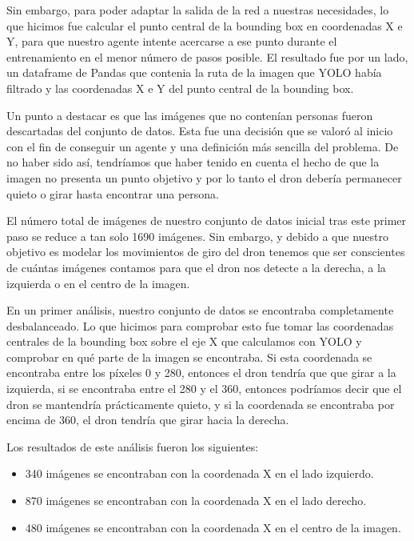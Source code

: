 Sin embargo, para poder adaptar la salida de la red a nuestras necesidades, lo que hicimos fue calcular el punto central de la bounding box en coordenadas X e Y, para que nuestro agente intente acercarse a ese punto durante el entrenamiento en el menor número de pasos posible.
El resultado fue por un lado, un dataframe de Pandas que contenia la ruta de la imagen que YOLO había filtrado y las coordenadas X e Y del punto central de la bounding box.
\medskip

Un punto a destacar es que las imágenes que no contenían personas fueron descartadas del conjunto de datos. Esta fue una decisión que se valoró al inicio con el fin de conseguir un agente y una definición más sencilla del problema. De no haber sido así, tendríamos que haber tenido en cuenta el hecho de que la imagen no presenta un punto objetivo y por lo tanto el dron debería permanecer quieto o girar hasta encontrar una persona.
\medskip

El número total de imágenes de nuestro conjunto de datos inicial tras este primer paso se reduce a tan solo 1690 imágenes. Sin embargo, y debido a que nuestro objetivo es modelar los movimientos de giro del dron tenemos que ser conscientes de cuántas imágenes contamos para que el dron nos detecte a la derecha, a la izquierda o en el centro de la imagen.
\medskip

En un primer análisis, nuestro conjunto de datos se encontraba completamente desbalanceado. Lo que hicimos para comprobar esto fue tomar las coordenadas centrales de la bounding box sobre el eje X que calculamos con YOLO y comprobar en qué parte de la imagen se encontraba. Si esta coordenada se encontraba entre los píxeles 0 y 280, entonces el dron tendría que que girar a la izquierda, si se encontraba entre el 280 y el 360, entonces podríamos decir que el dron se mantendría prácticamente quieto, y si la coordenada se encontraba por encima de 360, el dron tendría que girar hacia la derecha.
\medskip

Los resultados de este análisis fueron los siguientes:

\begin{itemize}
    \item 340 imágenes se encontraban con la coordenada X en el lado izquierdo.
    \item 870 imágenes se encontraban con la coordenada X en el lado derecho.
    \item 480 imágenes se encontraban con la coordenada X en el centro de la imagen.
\end{itemize}

